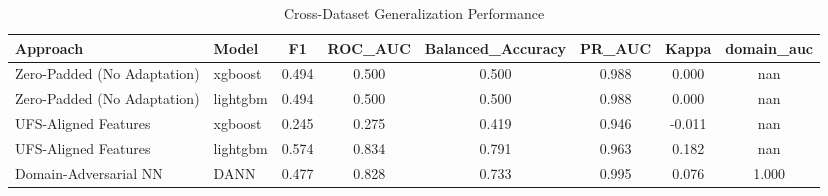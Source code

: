 \begin{table}[h]
\centering
\caption{Cross-Dataset Generalization Performance}
\label{tab:domain_adaptation}
\begin{tabular}{llcccccc}
\toprule
Approach & Model & F1 & ROC_AUC & Balanced_Accuracy & PR_AUC & Kappa & domain_auc \\
\midrule
Zero-Padded (No Adaptation) & xgboost & 0.494 & 0.500 & 0.500 & 0.988 & 0.000 & nan \\
Zero-Padded (No Adaptation) & lightgbm & 0.494 & 0.500 & 0.500 & 0.988 & 0.000 & nan \\
UFS-Aligned Features & xgboost & 0.245 & 0.275 & 0.419 & 0.946 & -0.011 & nan \\
UFS-Aligned Features & lightgbm & 0.574 & 0.834 & 0.791 & 0.963 & 0.182 & nan \\
Domain-Adversarial NN & DANN & 0.477 & 0.828 & 0.733 & 0.995 & 0.076 & 1.000 \\
\bottomrule
\end{tabular}
\end{table}
